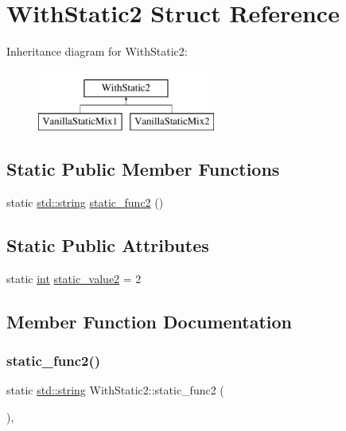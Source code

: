 \hypertarget{struct_with_static2}{}\section{With\+Static2 Struct Reference}
\label{struct_with_static2}
Inheritance diagram for With\+Static2\+:\begin{figure}[H]
\begin{center}
\leavevmode
\includegraphics[height=2.000000cm]{struct_with_static2}
\end{center}
\end{figure}
\subsection*{Static Public Member Functions}
\begin{DoxyCompactItemize}
\item 
static \mbox{\hyperlink{_s_d_l__opengl__glext_8h_ab4ccfaa8ab0e1afaae94dc96ef52dde1}{std\+::string}} \mbox{\hyperlink{struct_with_static2_ab78fd963bf1aa5452bc923c92103ef94}{static\+\_\+func2}} ()
\end{DoxyCompactItemize}
\subsection*{Static Public Attributes}
\begin{DoxyCompactItemize}
\item 
static \mbox{\hyperlink{warnings_8h_a74f207b5aa4ba51c3a2ad59b219a423b}{int}} \mbox{\hyperlink{struct_with_static2_add6875231bdb922e03512ace418f690a}{static\+\_\+value2}} = 2
\end{DoxyCompactItemize}


\subsection{Member Function Documentation}
\mbox{\label{struct_with_static2_ab78fd963bf1aa5452bc923c92103ef94}} 
\subsubsection{\texorpdfstring{static\_func2()}{static\_func2()}}
{\footnotesize\ttfamily static \mbox{\hyperlink{_s_d_l__opengl__glext_8h_ab4ccfaa8ab0e1afaae94dc96ef52dde1}{std\+::string}} With\+Static2\+::static\+\_\+func2 (\begin{DoxyParamCaption}{ }\end{DoxyParamCaption})\hspace{0.3cm}{\ttfamily [inline]}, {\ttfamily [static]}}



